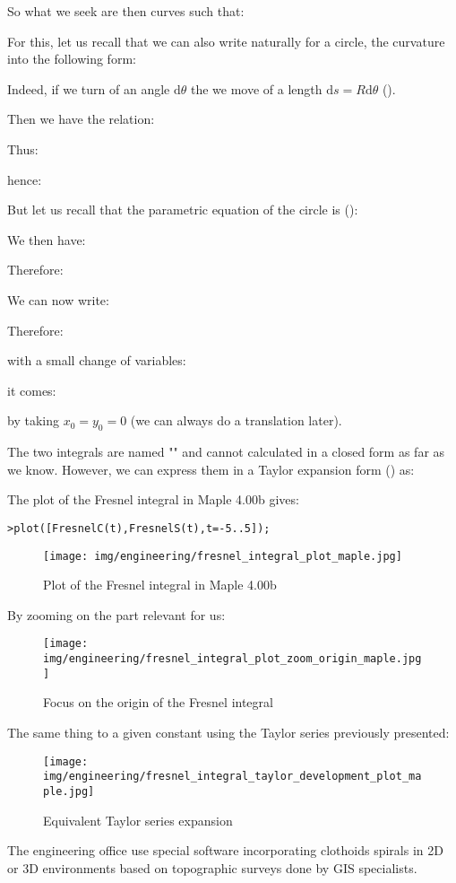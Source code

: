	So what we seek are then curves such that:
	
	For this, let us recall that we can also write naturally for a circle, the curvature into the following form:
	
	Indeed, if we turn of an angle $\mathrm{d}\theta$ the we move of a length $\mathrm{d}s=R\mathrm{d}\theta$ ().

	Then we have the relation:
	
	Thus:
	
	hence:
	
	But let us recall that the parametric equation of the circle is ():
	
	We then have:
	
	Therefore:
	
	We can now write:
	
	Therefore:
	
	with a small change of variables:
	
	it comes:
	
	by taking $x_0=y_0=0$ (we can always do a translation later).
	
	The two integrals are named "" and cannot calculated in a closed form as far as we know. However, we can express them in a Taylor expansion form () as:
	
	The plot of the Fresnel integral in Maple 4.00b gives:
	
	\texttt{>plot([FresnelC(t),FresnelS(t),t=-5..5]);}
	\begin{figure}[H]
		\centering
		\texttt{[image: img/engineering/fresnel\_integral\_plot\_maple.jpg]}
		\caption{Plot of the Fresnel integral in Maple 4.00b}
	\end{figure}
	By zooming on the part relevant for us:
	\begin{figure}[H]
		\centering
		\texttt{[image: img/engineering/fresnel\_integral\_plot\_zoom\_origin\_maple.jpg]}
		\caption[]{Focus on the origin of the Fresnel integral}
	\end{figure}
	The same thing to a given constant using the Taylor series previously presented:
	\begin{figure}[H]
		\centering
		\texttt{[image: img/engineering/fresnel\_integral\_taylor\_development\_plot\_maple.jpg]}
		\caption[]{Equivalent Taylor series expansion}
	\end{figure}
	The engineering office use special software incorporating clothoids spirals in 2D or 3D environments based on topographic surveys done by GIS specialists.
	
